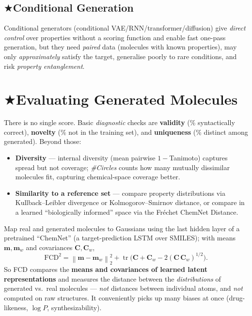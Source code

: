 \documentclass[11pt, oneside]{book}
\makeatletter
\newcommand{\starglyph}{\textcolor{stargold}{\ensuremath{\bigstar}}}
\newcommand{\starsec}[1]{%
  \texorpdfstring{\starglyph\hspace{0.4em}\textcolor{star@frame}{#1}}{#1}}
\newcommand{\norm}[1]{\left\lVert #1 \right\rVert}
\newcommand{\tr}{\operatorname{tr}}
\makeatother
\begin{document}
\subsection{\starsec{Conditional Generation}}

Conditional generators (conditional VAE/RNN/transformer/diffusion) give
\emph{direct control} over properties without a scoring function and enable fast
one-pass generation, but they need \emph{paired} data (molecules with known
properties), may only \emph{approximately} satisfy the target, generalise poorly to
rare conditions, and risk \emph{property entanglement}.
\vspace{-0.2 em}
\section{\starsec{Evaluating Generated Molecules}}

There is no single score. Basic \emph{diagnostic} checks are
\textbf{validity} (\% syntactically correct), \textbf{novelty} (\% not in the
training set), and \textbf{uniqueness} (\% distinct among generated). Beyond those:

\begin{itemize}
  \item \textbf{Diversity} --- internal diversity (mean pairwise $1-$Tanimoto)
        captures spread but not coverage; \emph{\#Circles} counts how many mutually
        dissimilar molecules fit, capturing chemical-space coverage better.
  \item \textbf{Similarity to a reference set} --- compare property distributions via
        Kullback--Leibler divergence or Kolmogorov--Smirnov distance, or compare in a
        learned ``biologically informed'' space via the Fréchet ChemNet Distance.
\end{itemize}

\begin{thmbox}[title={Fréchet ChemNet Distance (FCD)}]
Map real and generated molecules to Gaussians using the last hidden layer of a
pretrained ``ChemNet'' (a target-prediction LSTM over SMILES); with means
$\bm{m},\bm{m}_w$ and covariances $\bm{C},\bm{C}_w$,
\[
  \mathrm{FCD}^2 = \norm{\bm{m}-\bm{m}_w}_2^2
  + \tr\!\Big(\bm{C}+\bm{C}_w - 2(\bm{C}\,\bm{C}_w)^{1/2}\Big).
\]
So FCD compares the \textbf{means and covariances of learned latent
representations} and measures the distance between the \emph{distributions} of
generated vs.\ real molecules --- \emph{not} distances between individual atoms, and
\emph{not} computed on raw structures. It conveniently picks up many biases at once
(drug-likeness, $\log P$, synthesizability).
\end{thmbox}
\end{document}
